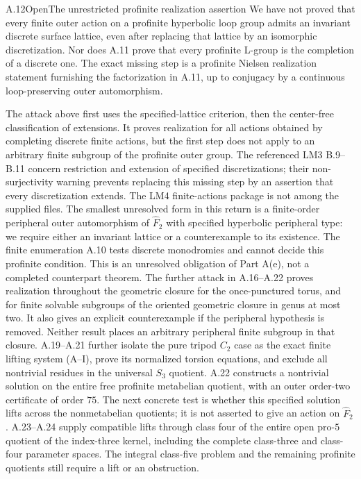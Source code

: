 \begin{statement}{A.12}{Open}{The unrestricted profinite realization assertion}
We have not proved that every finite outer action on a profinite
hyperbolic loop group admits an invariant discrete surface
lattice, even after replacing that lattice by an isomorphic
discretization. Nor does A.11 prove that every profinite
L-group is the completion of a discrete one. The exact missing
step is a profinite Nielsen realization statement furnishing
the factorization in A.11, up to conjugacy by a continuous
loop-preserving outer automorphism.
\end{statement}
The attack above first uses the specified-lattice criterion,
then the center-free classification of extensions. It proves
realization for all actions obtained by completing discrete
finite actions, but the first step does not apply to an
arbitrary finite subgroup of the profinite outer group.
The referenced LM3 B.9--B.11 concern restriction and extension
of specified discretizations; their non-surjectivity warning
prevents replacing this missing step by an assertion that
every discretization extends. The LM4 finite-actions package
is not among the supplied files. The smallest unresolved
form in this return is a finite-order peripheral outer
automorphism of $\widehat F_2$ with specified hyperbolic
peripheral type: we require either an invariant lattice or
a counterexample to its existence. The finite enumeration
A.10 tests discrete monodromies and cannot decide this
profinite condition. This is an unresolved obligation of
Part A(e), not a completed counterpart theorem. The further attack
in A.16--A.22 proves realization throughout the geometric closure
for the once-punctured torus, and for finite solvable subgroups of
the oriented geometric closure in genus at most two. It also gives
an explicit counterexample if the peripheral hypothesis is removed.
Neither result places an arbitrary peripheral finite subgroup in
that closure. A.19--A.21 further isolate the pure tripod
$C_2$ case as the exact finite lifting system
\textup{(A--I)}, prove its normalized torsion equations,
and exclude all nontrivial residues in the universal
$S_3$ quotient. A.22 constructs a nontrivial solution
on the entire free profinite metabelian quotient,
with an outer order-two certificate of order $75$.
The next concrete test is whether this specified
solution lifts across the nonmetabelian quotients;
it is not asserted to give an action on $\widehat F_2$.
A.23--A.24 supply compatible lifts through class four
of the entire open pro-$5$ quotient of the
index-three kernel, including the complete
class-three and class-four parameter spaces.
The integral class-five problem and the remaining
profinite quotients still require a lift or an obstruction.

